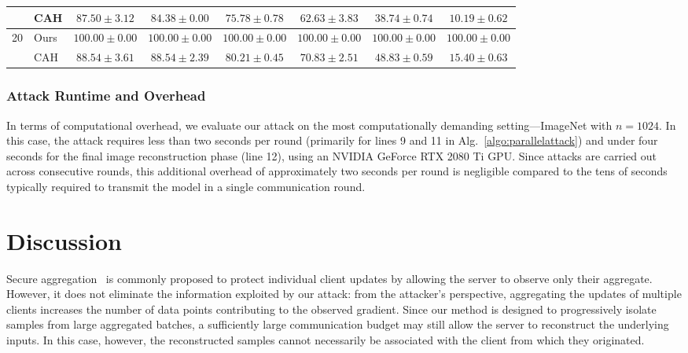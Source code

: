 \begin{table}[t]
\begin{tabular}{@{}clcccccc@{}}
        & CAH  & $87.50 \pm 3.12$ & $84.38 \pm 0.00$ & $75.78 \pm 0.78$
               & $62.63 \pm 3.83$ & $38.74 \pm 0.74$ & $10.19 \pm 0.62$ \\
        \midrule
        \multirow{2}{*}{20}
        & Ours & $\mathbf{100.00} \pm 0.00$ & $\mathbf{100.00} \pm 0.00$ & $\mathbf{100.00} \pm 0.00$
               & $\mathbf{100.00} \pm 0.00$ & $\mathbf{100.00} \pm 0.00$ & $\mathbf{100.00} \pm 0.00$ \\
        & CAH  & $88.54 \pm 3.61$ & $88.54 \pm 2.39$ & $80.21 \pm 0.45$
               & $70.83 \pm 2.51$ & $48.83 \pm 0.59$ & $15.40 \pm 0.63$ \\
        \bottomrule
    \end{tabular}
\end{table}


 \subsubsection{Attack Runtime and Overhead}

In terms of computational overhead, we evaluate our attack on the most computationally demanding setting—ImageNet with $n=1024$. In this case, the attack requires less than two seconds per round (primarily for lines 9 and 11 in Alg.~\ref{algo:parallelattack}) and under four seconds for the final image reconstruction phase (line 12), using an NVIDIA GeForce RTX 2080 Ti GPU. Since attacks are carried out across consecutive rounds, this additional overhead of approximately two seconds per round is negligible compared to the tens of seconds typically required to transmit the model in a single communication round.


\section{Discussion}\label{sec}

Secure aggregation~\cite{secure_aggregation_bonawitz} is commonly proposed to protect individual client updates by allowing the server to observe only their aggregate. However, it does not eliminate the information exploited by our attack: from the attacker's perspective, aggregating the updates of multiple clients increases the number of data points contributing to the observed gradient. Since our method is designed to progressively isolate samples from large aggregated batches, a sufficiently large communication budget may still allow the server to reconstruct the underlying inputs. In this case, however, the reconstructed samples cannot necessarily be associated with the client from which they originated.

